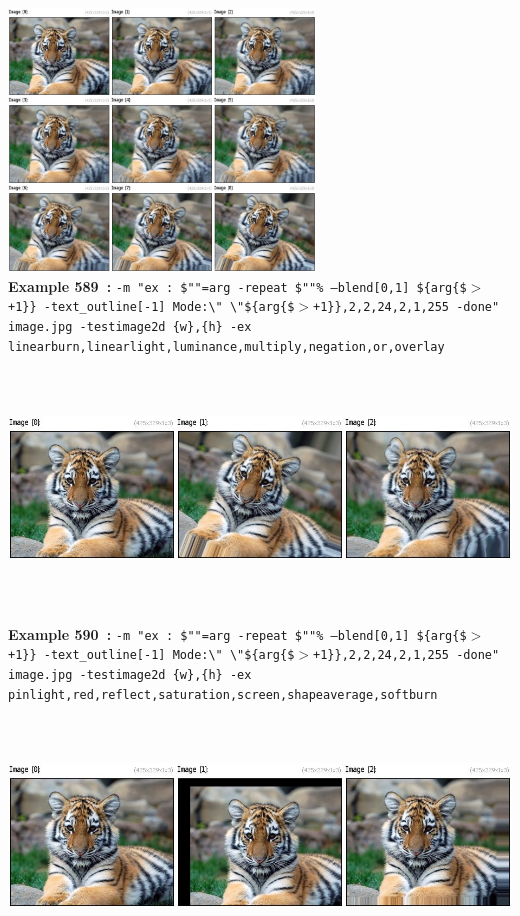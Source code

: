 \documentclass[a4paper,11pt,twoside]{book}
\begin{document}
\begin{center}
\\\includegraphics[keepaspectratio=true,height=7cm,width=\textwidth]{img/gmic_def589.jpg}\\
{\footnotesize \textbf{Example 589~:} \texttt{-m "ex : \$""=arg -repeat \$""\% --blend[0,1] \$\{arg\{\$$>$+1\}\} -text\_outline[-1] Mode:\textbackslash " \textbackslash "\$\{arg\{\$$>$+1\}\},2,2,24,2,1,255 -done" image.jpg -testimage2d \{w\},\{h\} -ex linearburn,linearlight,luminance,multiply,negation,or,overlay}}
\\\includegraphics[keepaspectratio=true,height=7cm,width=\textwidth]{img/gmic_def590.jpg}\\
{\footnotesize \textbf{Example 590~:} \texttt{-m "ex : \$""=arg -repeat \$""\% --blend[0,1] \$\{arg\{\$$>$+1\}\} -text\_outline[-1] Mode:\textbackslash " \textbackslash "\$\{arg\{\$$>$+1\}\},2,2,24,2,1,255 -done" image.jpg -testimage2d \{w\},\{h\} -ex pinlight,red,reflect,saturation,screen,shapeaverage,softburn}}
\\\includegraphics[keepaspectratio=true,height=7cm,width=\textwidth]{img/gmic_def591.jpg}\\

\end{center}
\end{document}
